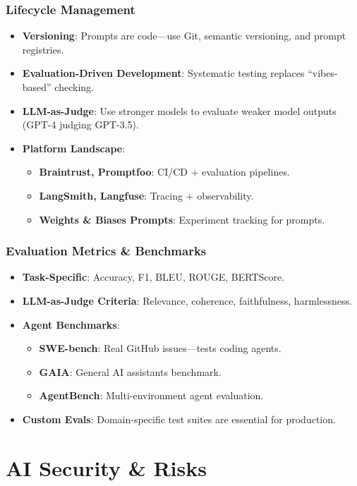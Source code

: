 \documentclass{beamer}
\begin{document}
\begin{frame}
    \frametitle{Lifecycle Management}
    \begin{itemize}
        \item \textbf{Versioning}: Prompts are code---use Git, semantic versioning, and prompt registries.
        \item \textbf{Evaluation-Driven Development}: Systematic testing replaces ``vibes-based'' checking.
        \item \textbf{LLM-as-Judge}: Use stronger models to evaluate weaker model outputs (GPT-4 judging GPT-3.5).
        \item \textbf{Platform Landscape}:
        \begin{itemize}
            \item \textbf{Braintrust, Promptfoo}: CI/CD + evaluation pipelines.
            \item \textbf{LangSmith, Langfuse}: Tracing + observability.
            \item \textbf{Weights \& Biases Prompts}: Experiment tracking for prompts.
        \end{itemize}
    \end{itemize}
\end{frame}

\begin{frame}
    \frametitle{Evaluation Metrics \& Benchmarks}
    \begin{itemize}
        \item \textbf{Task-Specific}: Accuracy, F1, BLEU, ROUGE, BERTScore.
        \item \textbf{LLM-as-Judge Criteria}: Relevance, coherence, faithfulness, harmlessness.
        \item \textbf{Agent Benchmarks}:
        \begin{itemize}
            \item \textbf{SWE-bench}: Real GitHub issues---tests coding agents.
            \item \textbf{GAIA}: General AI assistants benchmark.
            \item \textbf{AgentBench}: Multi-environment agent evaluation.
        \end{itemize}
        \item \textbf{Custom Evals}: Domain-specific test suites are essential for production.
    \end{itemize}
\end{frame}

\section{AI Security \& Risks}
\end{document}
